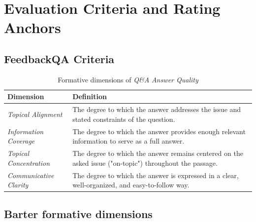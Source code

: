 \section{Evaluation Criteria and Rating Anchors}
\label{app:evaluation_criteria}

\subsection{FeedbackQA Criteria}
\label{app:feedbackqa_criteria}

\begin{table}[h]
    \centering
    \caption{Formative dimensions of \textit{Q\&A Answer Quality}}
    \label{tab:feedbackqa_formative_dimensions}
    \begin{tabularx}{\textwidth}{lX}
    \toprule
    Dimension & Definition \\
    \midrule
    \textit{Topical Alignment} & The degree to which the answer addresses the issue and stated constraints of the question. \\
    \textit{Information Coverage} & The degree to which the answer provides enough relevant information to serve as a full answer. \\
    \textit{Topical Concentration} & The degree to which the answer remains centered on the asked issue ("on-topic") throughout the passage. \\
    \textit{Communicative Clarity} & The degree to which the answer is expressed in a clear, well-organized, and easy-to-follow way. \\
    \bottomrule
    \end{tabularx}
\end{table}


\clearpage
\subsection{Barter formative dimensions}
\label{app:barter_criteria}

